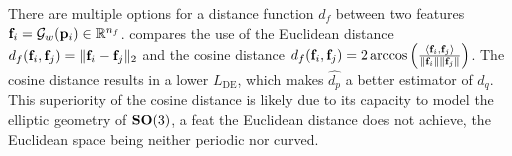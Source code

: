 There are multiple options for a distance function $d_f$ between two features $\mathbf{f}_i = \mathcal{G}_w(\mathbf{p}_i) \in \mathbb{R}^{n_f}$.
 compares the use of the Euclidean distance $d_f(\mathbf{f}_i, \mathbf{f}_j) = \Vert \mathbf{f}_i - \mathbf{f}_j \Vert_2$ and the cosine distance $d_f(\mathbf{f}_i, \mathbf{f}_j) = 2 \arccos \left( \frac{\langle \mathbf{f}_i, \mathbf{f}_j \rangle}{\lVert \mathbf{f}_i \rVert \lVert \mathbf{f}_j \rVert} \right)$. The cosine distance results in a lower $L_\text{DE}$, which makes $\widehat{d_p}$ a better estimator of $d_q$.
This superiority of the cosine distance is likely due to its capacity to model the elliptic geometry of $\mathrm{\mathbf{SO}}(3)$, a feat the Euclidean distance does not achieve, the Euclidean space being neither periodic nor curved.



